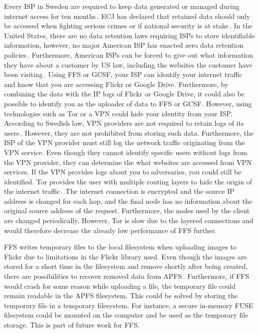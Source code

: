 Every \gls{ISP} in Sweden are required to keep data generated or managed during internet access for ten months\,\cite{post-ochtelestyrelsenFragorOchSvar2019}. \gls{ECJ} has declared that retained data should only be accessed when fighting serious crimes or if national security is at stake\,\cite{EuropeanCourtJustice2017}. In the United States, there are no data retention laws requiring \gls{ISP}s to store identifiable information, however, no major American \gls{ISP} has enacted zero data retention policies\,\cite{lawofficesofsalaratrizadehUnitedStatesData2021}. Furthermore, American \gls{ISP}s can be forced to give out what information they have about a customer by US law, including the websites the customer have been visiting\,\cite{instituteDataRetentionLaws}. Using \gls{FFS} or \gls{GCSF}, your \gls{ISP} can identify your internet traffic and know that you are accessing Flickr or Google Drive. Furthermore, by combining the data with the IP logs of Flickr or Google Drive, it could also be possible to identify you as the uploader of data to \gls{FFS} or \gls{GCSF}. However, using technologies such as Tor or a \gls{VPN} could hide your identity from your \gls{ISP}. According to Swedish law, \gls{VPN} providers are not required to retain logs of its users\,\cite{walshInternetCensorshipSweden2020}. However, they are not prohibited from storing such data. Furthermore, the \gls{ISP} of the \gls{VPN} provider must still log the network traffic originating from the \gls{VPN} service. Even though they cannot identify specific users without logs from the \gls{VPN} provider, they can determine the what websites are accessed from \gls{VPN} services. If the \gls{VPN} provides logs about you to adversaries, you could still be identified. Tor provides the user with multiple routing layers to hide the origin of the internet traffic\,\cite{ramadhaniAnonymityCommunicationVPN2018}. The internet connection is encrypted and the source IP address is changed for each hop, and the final node has no information about the original source address of the request. Furthermore, the nodes used by the client are changed periodically. However, Tor is slow due to the layered connections and would therefore decrease the already low performance of \gls{FFS} further. 

\gls{FFS} writes temporary files to the local filesystem when uploading images to Flickr due to limitations in the Flickr library used. Even though the images are stored for a short time in the filesystem and remove shortly after being created, there are possibilities to recover removed data from \gls{APFS}\,\cite{llcsysdevlaboratoriesHowRecoverData2022,cedricAPFSDataRecovery2022,santosHowRecoverData2021}. Furthermore, if \gls{FFS} would crash for some reason while uploading a file, the temporary file could remain readable in the \gls{APFS} filesystem. This could be solved by storing the temporary file in a temporary filesystem. For instance, a secure in-memory \gls{FUSE} filesystem could be mounted on the computer and be used as the temporary file storage. This is part of future work for \gls{FFS}.

